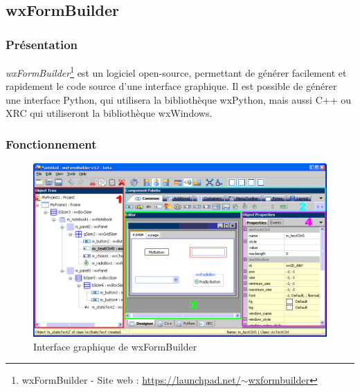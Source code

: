 
\subsection{wxFormBuilder}


\subsubsection{Présentation}

\textit{wxFormBuilder}\footnote{wxFormBuilder - Site web : \href{https://launchpad.net/~wxformbuilder}{https://launchpad.net/$\sim$wxformbuilder}} est un logiciel open-source, permettant de générer facilement et rapidement le code source d'une interface graphique.
Il est possible de générer une interface Python, qui utilisera la bibliothèque wxPython, mais aussi C++ ou XRC qui utiliseront la bibliothèque wxWindows.
\\




\subsubsection{Fonctionnement}

\begin{figure}[!h]
	\center
	\includegraphics[scale=0.5]{img/wxFormBuilder.png}
	\caption{Interface graphique de wxFormBuilder}
	\label{Interface graphique de wxFormBuilder}
\end{figure}

